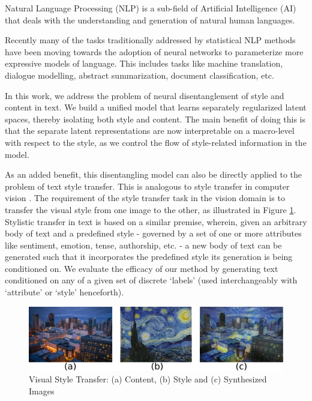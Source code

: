 Natural Language Processing (NLP) is a sub-field of Artificial Intelligence (AI) that deals with the understanding and generation of natural human languages.

Recently many of the tasks traditionally addressed by statistical NLP methods have been moving towards the adoption of neural networks to parameterize more expressive models of language. This includes tasks like machine translation, dialogue modelling, abstract summarization, document classification, etc.

In this work, we address the problem of neural disentanglement of style and content in text. We build a unified model that learns separately regularized latent spaces, thereby isolating both style and content. The main benefit of doing this is that the separate latent representations are now interpretable on a macro-level with respect to the style, as we control the flow of style-related information in the model.

As an added benefit, this disentangling model can also be directly applied to the problem of text style transfer. This is analogous to style transfer in computer vision \citep{gatys2016image}. The requirement of the style transfer task in the vision domain is to transfer the visual style from one image to the other, as illustrated in Figure \ref{fig:style-transfer-vision}. Stylistic transfer in text is based on a similar premise, wherein, given an arbitrary body of text and a predefined style - governed by a set of one or more attributes like sentiment, emotion, tense, authorship, etc. - a new body of text can be generated such that it incorporates the predefined style its generation is being conditioned on. We evaluate the efficacy of our method by generating text conditioned on any of a given set of discrete `labels' (used interchangeably with `attribute' or `style' henceforth).


\begin{figure}[ht]
	\centering
	\includegraphics[width=\textwidth]{images/style-transfer-vision}
	\caption{\label{fig:style-transfer-vision}Visual Style Transfer: (a) Content, (b) Style and (c) Synthesized Images}
\end{figure}


